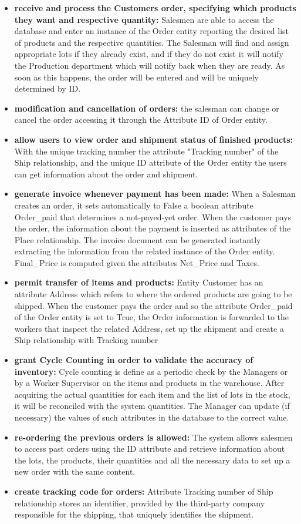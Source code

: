 \begin{itemize}
    \item \textbf{receive and process the Customers order, specifying which products they want and respective quantity:} Salesmen are able to access the database and enter an instance of the Order entity reporting the desired list of products and the respective quantities. The Salesman will find and assign appropriate lots if they already exist, and if they do not exist it will notify the Production department which will notify back when they are ready. As soon as this happens, the order will be entered and will be uniquely determined by ID.
    \item \textbf{modification and cancellation of orders:} the salesman can change or cancel the order accessing it through the Attribute ID of Order entity.
    \item \textbf{allow users to view order and shipment status of finished products:} With the unique tracking number the attribute "Tracking number" of the Ship relationship, and the unique ID attribute of the Order entity the users can get information about the order and shipment.
    \item \textbf{generate invoice whenever payment has been made:} When a Salesman creates an order, it sets automatically to False a boolean attribute Order\_paid that determines a not-payed-yet order. When the customer pays the order, the information about the payment is inserted as attributes of the Place relationship. The invoice document can be generated instantly extracting the information from the related instance of the Order entity. Final\_Price is computed given the attributes Net\_Price and Taxes.
    \item \textbf{permit transfer of items and products:} Entity Customer has an attribute Address which refers to where the ordered products are going to be shipped. When the customer pays the order and so the attribute Order\_paid of the Order entity is set to True, the Order information is forwarded to the workers that inspect the related Address, set up the shipment and create a Ship relationship with Tracking number
    \item \textbf{grant Cycle Counting in order to validate the accuracy of inventory:} Cycle counting is define as a periodic check by the Managers or by a Worker Supervisor on the items and products in the warehouse. After acquiring the actual quantities for each item and the list of lots in the stock, it will be reconciled with the system quantities. The Manager can update (if necessary) the values of such attributes in the database to the correct value.
    \item \textbf{re-ordering the previous orders is allowed:} The system allows salesmen to access past orders using the ID attribute and retrieve information about the lots, the products, their quantities and all the necessary data to set up a new order with the same content.
    \item \textbf{create tracking code for orders:} Attribute Tracking number of Ship relationship stores an identifier, provided by the third-party company responsible for the shipping, that uniquely identifies the shipment.
\end{itemize}



